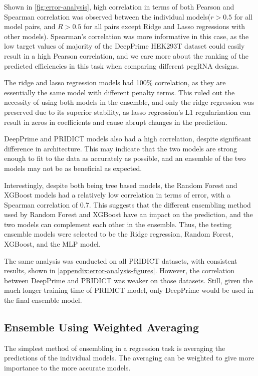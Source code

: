 Shown in \autoref{fig:error-analysis}, high correlation in terms of both Pearson and Spearman correlation was observed between the individual models($r>0.5$ for all model pairs, and $R>0.5$ for all pairs except Ridge and Lasso regressions with other models). Spearman's correlation was more informative in this case, as the low target values of majority of the DeepPrime HEK293T dataset could easily result in a high Pearson correlation, and we care more about the ranking of the predicted efficiencies in this task when comparing different pegRNA designs.

The ridge and lasso regression models had 100\% correlation, as they are essentially the same model with different penalty terms. This ruled out the necessity of using both models in the ensemble, and only the ridge regression was preserved due to its superior stability, as lasso regression's L1 regularization can result in zeros in coefficients and cause abrupt changes in the prediction. 

DeepPrime and PRIDICT models also had a high correlation, despite significant difference in architecture. This may indicate that the two models are strong enough to fit to the data as accurately as possible, and an ensemble of the two models may not be as beneficial as expected. 

Interestingly, despite both being tree based models, the Random Forest and XGBoost models had a relatively low correlation in terms of error, with a Spearman correlation of 0.7. This suggests that the different ensembling method used by Random Forest and XGBoost have an impact on the prediction, and the two models can complement each other in the ensemble. Thus, the testing ensemble models were selected to be the Ridge regression, Random Forest, XGBoost, and the MLP model.

The same analysis was conducted on all PRIDICT datasets, with consistent results, shown in \autoref{appendix:error-analysis-figures}. However, the correlation between DeepPrime and PRIDICT was weaker on those datasets. Still, given the much longer training time of PRIDICT model, only DeepPrime would be used in the final ensemble model.


\subsection{Ensemble Using Weighted Averaging}

The simplest method of ensembling in a regression task is averaging the predictions of the individual models. The averaging can be weighted to give more importance to the more accurate models. 

